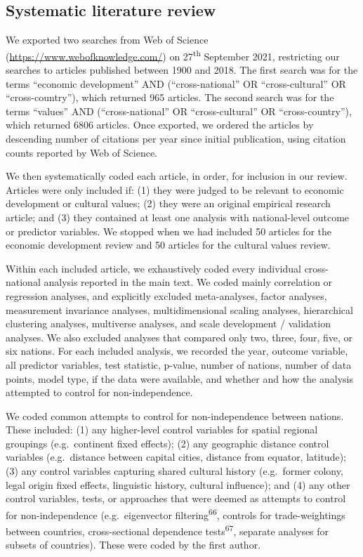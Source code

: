 \documentclass[
  english,
  man,floatsintext]{apa6}
\begin{document}
\hypertarget{systematic-literature-review}{%
\subsection{Systematic literature review}\label{systematic-literature-review}}

We exported two searches from Web of Science (\url{https://www.webofknowledge.com/}) on 27\textsuperscript{th} September 2021, restricting our searches to articles published between 1900 and 2018. The first search was for the terms \enquote{economic development} AND (\enquote{cross-national} OR \enquote{cross-cultural} OR \enquote{cross-country}), which returned 965 articles. The second search was for the terms \enquote{values} AND (\enquote{cross-national} OR \enquote{cross-cultural} OR \enquote{cross-country}), which returned 6806 articles. Once exported, we ordered the articles by descending number of citations per year since initial publication, using citation counts reported by Web of Science.

We then systematically coded each article, in order, for inclusion in our review. Articles were only included if: (1) they were judged to be relevant to economic development or cultural values; (2) they were an original empirical research article; and (3) they contained at least one analysis with national-level outcome or predictor variables. We stopped when we had included 50 articles for the economic development review and 50 articles for the cultural values review.

Within each included article, we exhaustively coded every individual cross-national analysis reported in the main text. We coded mainly correlation or regression analyses, and explicitly excluded meta-analyses, factor analyses, measurement invariance analyses, multidimensional scaling analyses, hierarchical clustering analyses, multiverse analyses, and scale development / validation analyses. We also excluded analyses that compared only two, three, four, five, or six nations. For each included analysis, we recorded the year, outcome variable, all predictor variables, test statistic, p-value, number of nations, number of data points, model type, if the data were available, and whether and how the analysis attempted to control for non-independence.

We coded common attempts to control for non-independence between nations. These included: (1) any higher-level control variables for spatial regional groupings (e.g.~continent fixed effects); (2) any geographic distance control variables (e.g.~distance between capital cities, distance from equator, latitude); (3) any control variables capturing shared cultural history (e.g.~former colony, legal origin fixed effects, linguistic history, cultural influence); and (4) any other control variables, tests, or approaches that were deemed as attempts to control for non-independence (e.g.~eigenvector filtering\textsuperscript{66}, controls for trade-weightings between countries, cross-sectional dependence tests\textsuperscript{67}, separate analyses for subsets of countries). These were coded by the first author.
\end{document}
